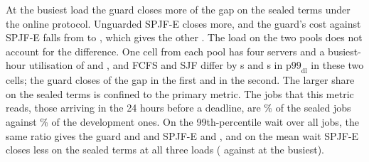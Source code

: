 At the busiest load the guard closes  more of the gap on the sealed terms
under the online protocol. Unguarded SPJF-E closes  more, and the guard's
cost against SPJF-E falls from  to , which gives the other
. The load on the two pools does not account for the difference. One cell from each pool has
four servers and a busiest-hour utilisation of  and , and
FCFS and SJF differ by  s and  s in
$\mathrm{p99}_{\mathrm{dl}}$ in these two cells; the guard closes  of the gap
in the first and  in the second. The larger share on the sealed terms is confined to
the primary metric. The jobs that this metric reads, those arriving in the 24 hours before
a deadline, are \% of the sealed jobs against \% of the
development ones. On the
99th-percentile wait over all jobs, the same ratio gives the guard  and
 and SPJF-E  and , and on the mean wait
SPJF-E closes less on the sealed terms at all three loads ( against
 at the busiest).


